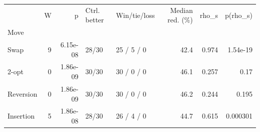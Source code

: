 \begin{tabular}{lrrllrrr}
\toprule
 & W & p & Ctrl. better & Win/tie/loss & Median red. (\%) & rho\_s & p(rho\_s) \\
Move &  &  &  &  &  &  &  \\
\midrule
Swap & 9 & 6.15e-08 & 28/30 & 25 / 5 / 0 & 42.4 & 0.974 & 1.54e-19 \\
2-opt & 0 & 1.86e-09 & 30/30 & 30 / 0 / 0 & 46.1 & 0.257 & 0.17 \\
Reversion & 0 & 1.86e-09 & 30/30 & 30 / 0 / 0 & 46.2 & 0.244 & 0.195 \\
Insertion & 5 & 1.86e-08 & 28/30 & 26 / 4 / 0 & 44.7 & 0.615 & 0.000301 \\
\bottomrule
\end{tabular}
